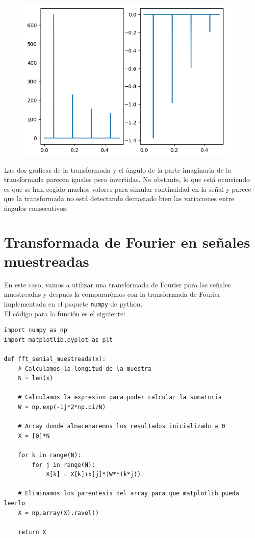 \documentclass[11pt,a4paper]{article}
\begin{document}
\begin{figure}[H]
	\centering
	\includegraphics[scale=0.55]{img/signal_fft.png}
\end{figure}

Las dos gráficas de la transformada y el ángulo de la parte imaginaria de la transformada parecen iguales pero invertidas. No obstante, lo que está ocurriendo es que se han cogido muchos valores para simular continuidad en la señal y parece que la transformada no está detectando demasiado bien las variaciones entre ángulos consecutivos.

\newpage

\section{Transformada de Fourier en señales muestreadas}

En este caso, vamos a utilizar una transformada de Fourier para las señales muestreadas y después la compararémos con la transformada de Fourier implementada en el paquete \texttt{numpy} de python.\\

El código para la función es el siguiente:

\begin{lstlisting}
import numpy as np
import matplotlib.pyplot as plt

def fft_senial_muestreada(x):
	# Calculamos la longitud de la muestra
    N = len(x)
    
    # Calculamos la expresion para poder calcular la sumatoria
    W = np.exp(-1j*2*np.pi/N)
    
    # Array donde almacenaremos los resultados inicializado a 0
    X = [0]*N

    for k in range(N):
        for j in range(N):
            X[k] = X[k]+x[j]*(W**(k*j))

	# Eliminamos los parentesis del array para que matplotlib pueda leerlo
    X = np.array(X).ravel()

    return X
\end{lstlisting}
\end{document}
